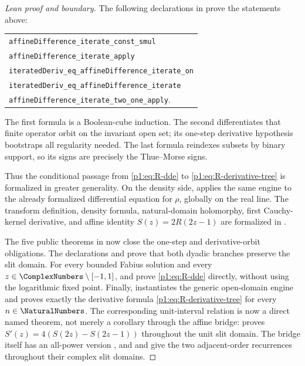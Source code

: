 \documentclass[11pt]{article}
\theoremstyle{definition}
\theoremstyle{remark}
\begin{document}
\begin{proof}[Lean proof and boundary]
The following declarations in  prove the statements above:
\begin{center}
\small
\begin{tabular}{l}
\texttt{affineDifference\_iterate\_const\_smul}\\
\texttt{affineDifference\_iterate\_apply}\\
\texttt{iteratedDeriv\_eq\_affineDifference\_iterate\_on}\\
\texttt{iteratedDeriv\_eq\_affineDifference\_iterate}\\
\texttt{affineDifference\_iterate\_two\_one\_apply}.
\end{tabular}
\end{center}
The first formula is a
Boolean-cube induction.  The second differentiates that finite operator orbit on the
invariant open set; its one-step derivative hypothesis bootstraps all regularity needed.
The last formula reindexes subsets by binary support, so its signs are precisely the
Thue--Morse signs.

Thus the conditional passage from \eqref{p1:eq:R-dde} to
\eqref{p1:eq:R-derivative-tree} is formalized in greater generality.  On the density side,
 applies the same engine to the
already formalized differential equation for \(\rho\), globally on the real line.  The
transform definition, density formula, natural-domain holomorphy, first Cauchy-kernel
derivative, and affine identity \(S(z)=2R(2z-1)\) are formalized in
.

The five public theorems in  now close the
one-step and derivative-orbit obligations.  The declarations
 and
 prove that both dyadic
branches preserve the slit domain.  For every bounded Fabius solution and
every \(z\in\ComplexNumbers\setminus[-1,1]\),
 and
 prove \eqref{p1:eq:R-dde} directly, without
using the logarithmic fixed point.  Finally,
 instantiates the
generic open-domain engine and proves exactly the derivative formula
\eqref{p1:eq:R-derivative-tree} for every \(n\in\NaturalNumbers\).  The corresponding
unit-interval relation is now a direct named theorem, not merely a corollary through the
affine bridge:
 proves
\(S'(z)=4(S(2z)-S(2z-1))\) throughout the unit slit domain.
The bridge itself has an all-power version
, and
 and  give the two
adjacent-order recurrences throughout their complex slit domains.


\end{proof}
\end{document}
